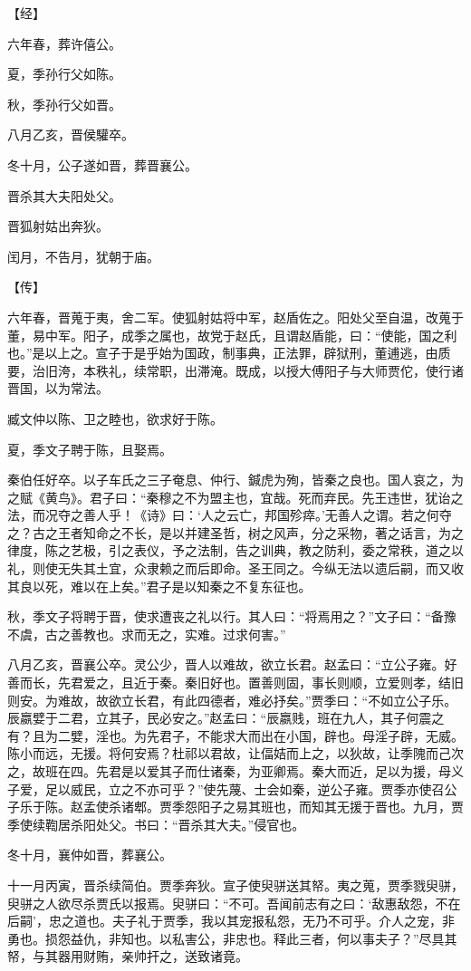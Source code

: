 \documentclass[a4paper,12pt,UTF8,twoside]{ctexbook}
\begin{document}
【经】

六年春，葬许僖公。

夏，季孙行父如陈。

秋，季孙行父如晋。

八月乙亥，晋侯驩卒。

冬十月，公子遂如晋，葬晋襄公。

晋杀其大夫阳处父。

晋狐射姑出奔狄。

闰月，不告月，犹朝于庙。

【传】

六年春，晋蒐于夷，舍二军。使狐射姑将中军，赵盾佐之。阳处父至自温，改蒐于董，易中军。阳子，成季之属也，故党于赵氏，且谓赵盾能，曰：“使能，国之利也。”是以上之。宣子于是乎始为国政，制事典，正法罪，辟狱刑，董逋逃，由质要，治旧洿，本秩礼，续常职，出滞淹。既成，以授大傅阳子与大师贾佗，使行诸晋国，以为常法。

臧文仲以陈、卫之睦也，欲求好于陈。

夏，季文子聘于陈，且娶焉。

秦伯任好卒。以子车氏之三子奄息、仲行、鍼虎为殉，皆秦之良也。国人哀之，为之赋《黄鸟》。君子曰：“秦穆之不为盟主也，宜哉。死而弃民。先王违世，犹诒之法，而况夺之善人乎！《诗》曰：‘人之云亡，邦国殄瘁。’无善人之谓。若之何夺之？古之王者知命之不长，是以并建圣哲，树之风声，分之采物，著之话言，为之律度，陈之艺极，引之表仪，予之法制，告之训典，教之防利，委之常秩，道之以礼，则使无失其土宜，众隶赖之而后即命。圣王同之。今纵无法以遗后嗣，而又收其良以死，难以在上矣。”君子是以知秦之不复东征也。

秋，季文子将聘于晋，使求遭丧之礼以行。其人曰：“将焉用之？”文子曰：“备豫不虞，古之善教也。求而无之，实难。过求何害。”

八月乙亥，晋襄公卒。灵公少，晋人以难故，欲立长君。赵孟曰：“立公子雍。好善而长，先君爱之，且近于秦。秦旧好也。置善则固，事长则顺，立爱则孝，结旧则安。为难故，故欲立长君，有此四德者，难必抒矣。”贾季曰：“不如立公子乐。辰嬴嬖于二君，立其子，民必安之。”赵孟曰：“辰嬴贱，班在九人，其子何震之有？且为二嬖，淫也。为先君子，不能求大而出在小国，辟也。母淫子辟，无威。陈小而远，无援。将何安焉？杜祁以君故，让偪姞而上之，以狄故，让季隗而己次之，故班在四。先君是以爱其子而仕诸秦，为亚卿焉。秦大而近，足以为援，母义子爱，足以威民，立之不亦可乎？”使先蔑、士会如秦，逆公子雍。贾季亦使召公子乐于陈。赵孟使杀诸郫。贾季怨阳子之易其班也，而知其无援于晋也。九月，贾季使续鞫居杀阳处父。书曰：“晋杀其大夫。”侵官也。

冬十月，襄仲如晋，葬襄公。

十一月丙寅，晋杀续简伯。贾季奔狄。宣子使臾骈送其帑。夷之蒐，贾季戮臾骈，臾骈之人欲尽杀贾氏以报焉。臾骈曰：“不可。吾闻前志有之曰：‘敌惠敌怨，不在后嗣’，忠之道也。夫子礼于贾季，我以其宠报私怨，无乃不可乎。介人之宠，非勇也。损怨益仇，非知也。以私害公，非忠也。释此三者，何以事夫子？”尽具其帑，与其器用财贿，亲帅扞之，送致诸竟。
\end{document}
